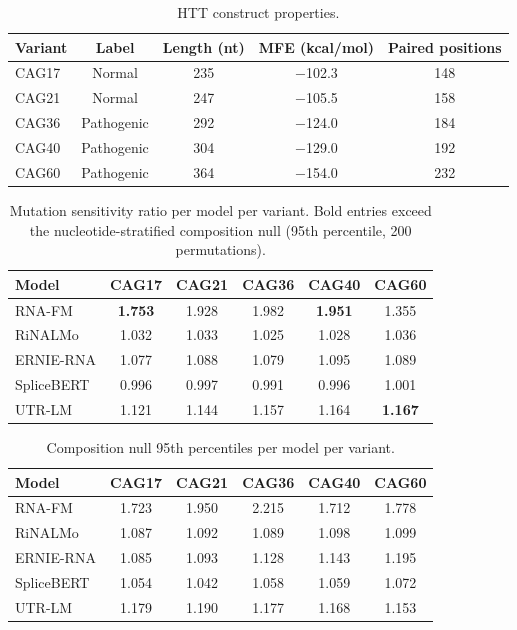 \documentclass[11pt]{article}
\begin{document}
\begin{table}[h]
\centering
\small
\caption{HTT construct properties.}
\begin{tabular}{@{}lcccc@{}}
\toprule
\textbf{Variant} & \textbf{Label} & \textbf{Length (nt)} &
  \textbf{MFE (kcal/mol)} & \textbf{Paired positions} \\
\midrule
CAG17 & Normal       & 235 & $-$102.3 & 148 \\
CAG21 & Normal       & 247 & $-$105.5 & 158 \\
CAG36 & Pathogenic   & 292 & $-$124.0 & 184 \\
CAG40 & Pathogenic   & 304 & $-$129.0 & 192 \\
CAG60 & Pathogenic   & 364 & $-$154.0 & 232 \\
\bottomrule
\end{tabular}
\end{table}

\begin{table}[h]
\centering
\small
\caption{Mutation sensitivity ratio per model per variant.
  Bold entries exceed the nucleotide-stratified composition null
  (95th percentile, 200 permutations).}
\begin{tabular}{@{}lccccc@{}}
\toprule
\textbf{Model} & \textbf{CAG17} & \textbf{CAG21} &
  \textbf{CAG36} & \textbf{CAG40} & \textbf{CAG60} \\
\midrule
RNA-FM     & \textbf{1.753} & 1.928 & 1.982 & \textbf{1.951} & 1.355 \\
RiNALMo    & 1.032 & 1.033 & 1.025 & 1.028 & 1.036 \\
ERNIE-RNA  & 1.077 & 1.088 & 1.079 & 1.095 & 1.089 \\
SpliceBERT & 0.996 & 0.997 & 0.991 & 0.996 & 1.001 \\
UTR-LM     & 1.121 & 1.144 & 1.157 & 1.164 & \textbf{1.167} \\
\bottomrule
\end{tabular}
\end{table}

\begin{table}[h]
\centering
\small
\caption{Composition null 95th percentiles per model per variant.}
\begin{tabular}{@{}lccccc@{}}
\toprule
\textbf{Model} & \textbf{CAG17} & \textbf{CAG21} &
  \textbf{CAG36} & \textbf{CAG40} & \textbf{CAG60} \\
\midrule
RNA-FM     & 1.723 & 1.950 & 2.215 & 1.712 & 1.778 \\
RiNALMo    & 1.087 & 1.092 & 1.089 & 1.098 & 1.099 \\
ERNIE-RNA  & 1.085 & 1.093 & 1.128 & 1.143 & 1.195 \\
SpliceBERT & 1.054 & 1.042 & 1.058 & 1.059 & 1.072 \\
UTR-LM     & 1.179 & 1.190 & 1.177 & 1.168 & 1.153 \\
\bottomrule
\end{tabular}
\end{table}
\end{document}
